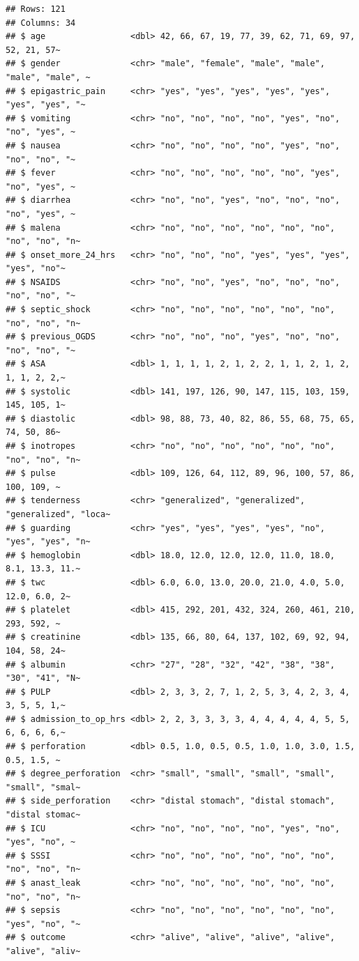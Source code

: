 \documentclass[
  10pt,
]{krantz}
\begin{document}
\begin{verbatim}
## Rows: 121
## Columns: 34
## $ age                 <dbl> 42, 66, 67, 19, 77, 39, 62, 71, 69, 97, 52, 21, 57~
## $ gender              <chr> "male", "female", "male", "male", "male", "male", ~
## $ epigastric_pain     <chr> "yes", "yes", "yes", "yes", "yes", "yes", "yes", "~
## $ vomiting            <chr> "no", "no", "no", "no", "yes", "no", "no", "yes", ~
## $ nausea              <chr> "no", "no", "no", "no", "yes", "no", "no", "no", "~
## $ fever               <chr> "no", "no", "no", "no", "no", "yes", "no", "yes", ~
## $ diarrhea            <chr> "no", "no", "yes", "no", "no", "no", "no", "yes", ~
## $ malena              <chr> "no", "no", "no", "no", "no", "no", "no", "no", "n~
## $ onset_more_24_hrs   <chr> "no", "no", "no", "yes", "yes", "yes", "yes", "no"~
## $ NSAIDS              <chr> "no", "no", "yes", "no", "no", "no", "no", "no", "~
## $ septic_shock        <chr> "no", "no", "no", "no", "no", "no", "no", "no", "n~
## $ previous_OGDS       <chr> "no", "no", "no", "yes", "no", "no", "no", "no", "~
## $ ASA                 <dbl> 1, 1, 1, 1, 2, 1, 2, 2, 1, 1, 2, 1, 2, 1, 1, 2, 2,~
## $ systolic            <dbl> 141, 197, 126, 90, 147, 115, 103, 159, 145, 105, 1~
## $ diastolic           <dbl> 98, 88, 73, 40, 82, 86, 55, 68, 75, 65, 74, 50, 86~
## $ inotropes           <chr> "no", "no", "no", "no", "no", "no", "no", "no", "n~
## $ pulse               <dbl> 109, 126, 64, 112, 89, 96, 100, 57, 86, 100, 109, ~
## $ tenderness          <chr> "generalized", "generalized", "generalized", "loca~
## $ guarding            <chr> "yes", "yes", "yes", "yes", "no", "yes", "yes", "n~
## $ hemoglobin          <dbl> 18.0, 12.0, 12.0, 12.0, 11.0, 18.0, 8.1, 13.3, 11.~
## $ twc                 <dbl> 6.0, 6.0, 13.0, 20.0, 21.0, 4.0, 5.0, 12.0, 6.0, 2~
## $ platelet            <dbl> 415, 292, 201, 432, 324, 260, 461, 210, 293, 592, ~
## $ creatinine          <dbl> 135, 66, 80, 64, 137, 102, 69, 92, 94, 104, 58, 24~
## $ albumin             <chr> "27", "28", "32", "42", "38", "38", "30", "41", "N~
## $ PULP                <dbl> 2, 3, 3, 2, 7, 1, 2, 5, 3, 4, 2, 3, 4, 3, 5, 5, 1,~
## $ admission_to_op_hrs <dbl> 2, 2, 3, 3, 3, 3, 4, 4, 4, 4, 4, 5, 5, 6, 6, 6, 6,~
## $ perforation         <dbl> 0.5, 1.0, 0.5, 0.5, 1.0, 1.0, 3.0, 1.5, 0.5, 1.5, ~
## $ degree_perforation  <chr> "small", "small", "small", "small", "small", "smal~
## $ side_perforation    <chr> "distal stomach", "distal stomach", "distal stomac~
## $ ICU                 <chr> "no", "no", "no", "no", "yes", "no", "yes", "no", ~
## $ SSSI                <chr> "no", "no", "no", "no", "no", "no", "no", "no", "n~
## $ anast_leak          <chr> "no", "no", "no", "no", "no", "no", "no", "no", "n~
## $ sepsis              <chr> "no", "no", "no", "no", "no", "no", "yes", "no", "~
## $ outcome             <chr> "alive", "alive", "alive", "alive", "alive", "aliv~
\end{verbatim}
\end{document}

